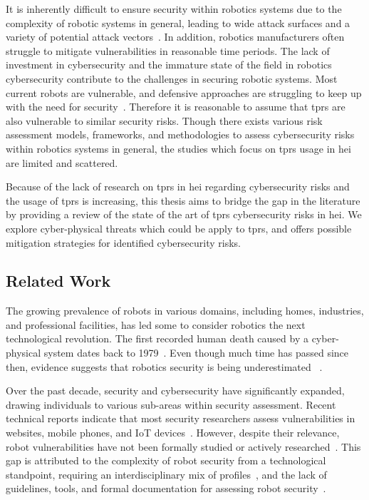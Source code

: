 It is inherently difficult to ensure security within robotics systems due to the complexity of robotic systems in general, leading to
wide
attack surfaces
and a variety
of potential attack vectors~\cite[2]{robot_security_review_2022}. In addition, robotics manufacturers often struggle to mitigate
vulnerabilities in reasonable time periods. The lack of investment in cybersecurity and the
immature state of the field in robotics cybersecurity contribute
to the challenges in securing robotic systems.
Most current robots are vulnerable, and defensive approaches are struggling
to keep up with the need for security~\cite[12]{robot_security_review_2022}. Therefore it is reasonable to assume that \ac{tprs} are also
vulnerable to similar security risks. Though there exists various risk assessment models, frameworks, and methodologies to assess
cybersecurity risks within robotics systems in general, the studies which focus on \ac{tprs} usage in \ac{hei} are limited and scattered.

Because of the lack of research on \ac{tprs} in \ac{hei} regarding cybersecurity risks and the usage of \ac{tprs}
is increasing, this thesis aims to bridge the gap in the literature by providing a review of the state of the art of
\ac{tprs} cybersecurity risks in \ac{hei}. We explore cyber-physical threats which could be apply to \ac{tprs}, and offers possible
mitigation strategies for identified cybersecurity risks.

\subsection{Related Work}
The growing prevalence of robots in various domains, including homes, industries, and professional facilities, has led some to
consider robotics the next technological revolution. The first recorded human death caused by a cyber-physical system
dates back to 1979~\cite[2]{robot_security_review_2022}. Even though much time has passed since then, evidence suggests that robotics security is being underestimated
~\cite[1-2]{
  robot_security_framework_2018}.

Over the past decade, security and cybersecurity have significantly expanded, drawing individuals to various sub-areas within security
assessment. Recent technical reports indicate that most security researchers assess vulnerabilities in
websites, mobile phones, and \ac{IoT} devices~\cite[]{dbir_2022, robot_security_review_2022}.
However, despite their relevance, robot vulnerabilities have not been formally studied or actively researched~\cite[1]{robot_security_review_2022}. This gap is attributed to the complexity of robot security from a
technological standpoint, requiring an interdisciplinary mix of profiles~\cite[74-77]{introduction_to_robot_system_security_2021}, and the lack of guidelines, tools, and formal documentation
for assessing robot security~\cite[7]{cyber_security_issues_in_robotics_2021}.

